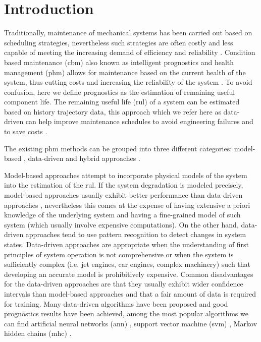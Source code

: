 \documentclass{article}
\begin{document}
\section{Introduction}
\label{sec:rul_intro}

Traditionally, maintenance of mechanical systems has been carried out based on scheduling strategies, nevertheless such strategies are often costly and less capable of meeting the increasing demand of efficiency and reliability \cite{Gebraeel2005, Zaidan2013}. Condition based maintenance (\gls{cbm}) also known as intelligent prognostics and health management (\gls{phm}) allows for maintenance based on the current health of the system, thus cutting costs and increasing the reliability of the system \cite{Zhao2017}. To avoid confusion, here we define prognostics as the estimation of remaining useful component life. The remaining useful life (\gls{rul}) of a system can be estimated based on history trajectory data, this approach which we refer here as data-driven can help improve maintenance schedules to avoid engineering failures and to save costs \cite{Lee2014}.

The existing \gls{phm} methods can be grouped into three different categories: model-based \cite{Yu2001} , data-driven \cite{Liu2009, Mosallam2013} and hybrid approaches \cite{Pecht2010, Liu2012}.

Model-based approaches attempt to incorporate physical models of the system into the estimation of the \gls{rul}. If the system degradation is modeled  precisely, model-based approaches usually exhibit better performance than data-driven approaches \cite{Qian2017}, nevertheless this comes at the expense of having extensive a priori knowledge of the underlying system and having a fine-grained model of such system (which usually involve expensive computations). On the other hand, data-driven approaches tend to use pattern recognition to detect changes in system states. Data-driven approaches are appropriate when the understanding of first principles of system operation is not comprehensive or when the system is sufficiently complex (i.e. jet engines, car engines, complex machinery) such that developing an accurate model is prohibitively expensive. Common disadvantages for the data-driven approaches are that they usually exhibit wider confidence intervals than model-based approaches and that a fair amount of data is required for training. Many data-driven algorithms have been proposed and good prognostics results have been achieved, among the most popular algorithms we can find artificial neural networks (\gls{ann}) \cite{Gebraeel2004}, support vector machine (\gls{svm}) \cite{Benkedjouh2013}, Markov hidden chains (\gls{mhc}) \cite{Dong2007}.
\end{document}
